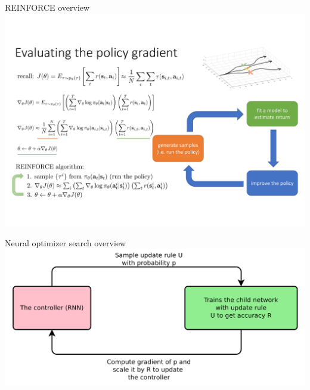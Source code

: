 \documentclass{beamer}
\begin{document}
{%
%
%
%
%
\begin{frame}{REINFORCE overview}
        \vspace{-0.8cm}
        \hspace*{-1.0cm}
        \includegraphics[scale=0.43]{data/reinforce_overview}
\end{frame}
}

{%
\begin{frame}{Neural optimizer search overview}
        \center{}
        \includegraphics[scale=0.275]{data/neural_arch_update}
\end{frame}
}
\end{document}
